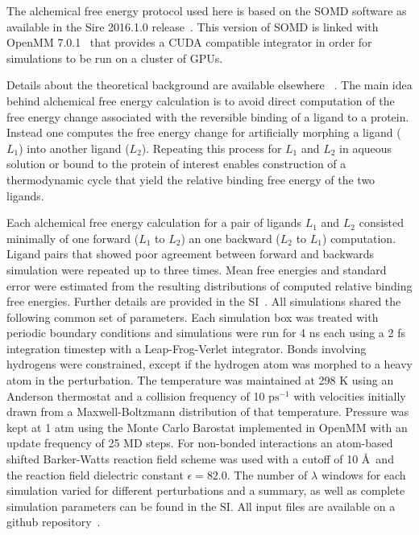 \documentclass{svjour3}                     %
\begin{document}
The alchemical free energy protocol used here is based on the SOMD software as available in the Sire 2016.1.0 release~\cite{Sire}. This version of SOMD is linked with OpenMM 7.0.1~\cite{OpenMM} that provides a CUDA compatible integrator in order for simulations to be run on a cluster of GPUs. 

Details about the theoretical background are available elsewhere 
~\cite{MichelFoloppeEssex2010,MobleyKlimovich2012,MichelEssex2010,ChoderaMobleyShirtsEtAl2011,ZeevaartWangThakurEtAl2008,SteinbrecherHrennDormannEtAl2008,WangDengRoux2006,WangWuDengEtAl2015}. The main idea behind alchemical free energy calculation is to avoid direct computation of the free energy change associated with the reversible binding of a ligand to a protein. Instead one computes the free energy change for artificially morphing a ligand ($L_1$) into another ligand ($L_2$). Repeating this process for $L_1$ and $L_2$ in aqueous solution or bound to the protein of interest enables construction of a thermodynamic cycle that yield the relative binding free energy of the two ligands.

Each alchemical free energy calculation for a pair of ligands $L_1$ and $L_2$ consisted minimally of one forward ($L_1$ to $L_2$) an one backward ($L_2$ to $L_1$) computation. Ligand pairs that showed poor agreement between forward and backwards simulation were repeated up to three times. Mean free energies and standard error were estimated from the resulting distributions of computed relative binding free energies. Further details are provided in the SI~\cite{SI}. 
All simulations shared the following common set of parameters. Each simulation box was treated with periodic boundary conditions and simulations were run for 4 ns each using a 2 fs integration timestep with a Leap-Frog-Verlet integrator. Bonds involving hydrogens were constrained, except if the hydrogen atom was morphed to a heavy atom in the perturbation. The temperature was maintained at 298 K using an Anderson thermostat and a collision frequency of 10 $\mathrm{ps}^{-1}$ with velocities initially drawn from a Maxwell-Boltzmann distribution of that temperature. Pressure was kept at 1 atm using the Monte Carlo Barostat implemented in OpenMM with an update frequency of 25 MD steps. For non-bonded interactions an atom-based shifted Barker-Watts reaction field scheme was used with a cutoff of 10 \AA~and the reaction field dielectric constant $\epsilon=82.0$. 
The number of \textit{$\lambda$} windows for each simulation varied for different perturbations and a summary, as well as complete simulation parameters can be found in the SI. All input files are available on a github repository~\cite{github}.
\end{document}
